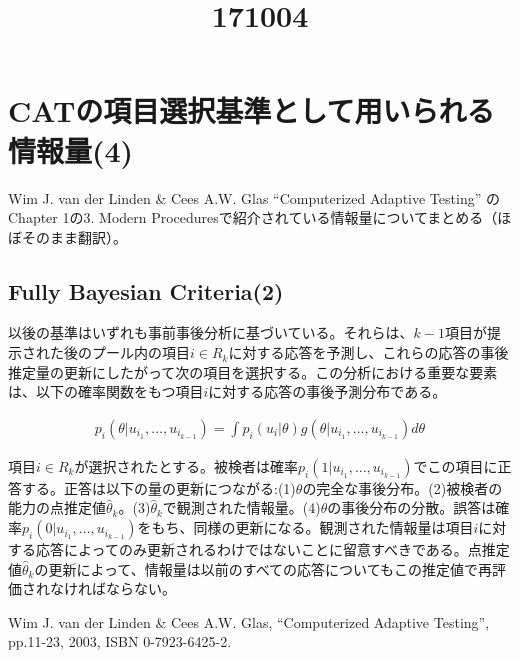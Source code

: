 \documentclass[a4j]{jarticle}
\date{}
\title{171004}
\begin{document}
\maketitle

\section{CATの項目選択基準として用いられる情報量(4)}
Wim J. van der Linden \& Cees A.W. Glas ``Computerized Adaptive Testing'' \cite{b1}のChapter 1の3. Modern Proceduresで紹介されている情報量についてまとめる（ほぼそのまま翻訳）。

\subsection{Fully Bayesian Criteria(2)}
以後の基準はいずれも事前事後分析に基づいている。それらは、$k-1$項目が提示された後のプール内の項目$i\in R_{k}$に対する応答を予測し、これらの応答の事後推定量の更新にしたがって次の項目を選択する。この分析における重要な要素は、以下の確率関数をもつ項目$i$に対する応答の事後予測分布である。

\begin{eqnarray}
  \label{e1}
  p_{i}(\theta|u_{i_{1}},\ldots,u_{i_{k-1}}) = \int p_{i}(u_{i}|\theta)g(\theta|u_{i_{1}},\ldots,u_{i_{k-1}})d\theta
\end{eqnarray}

項目$i\in R_{k}$が選択されたとする。被検者は確率$p_{i}(1|u_{i_{1}},\ldots,u_{i_{k-1}})$でこの項目に正答する。正答は以下の量の更新につながる:(1)$\theta$の完全な事後分布。(2)被検者の能力の点推定値$\hat{\theta}_{k}$。(3)$\hat{\theta}_{k}$で観測された情報量。(4)$\theta$の事後分布の分散。誤答は確率$p_{i}(0|u_{i_{1}},\ldots,u_{i_{k-1}})$をもち、同様の更新になる。観測された情報量は項目$i$に対する応答によってのみ更新されるわけではないことに留意すべきである。点推定値$\hat{\theta}_{k}$の更新によって、情報量は以前のすべての応答についてもこの推定値で再評価されなければならない。

\begin{thebibliography}{9}
   Wim J. van der Linden \& Cees A.W. Glas, ``Computerized Adaptive Testing'', pp.11-23, 2003, ISBN 0-7923-6425-2.
\end{thebibliography}
\end{document}
